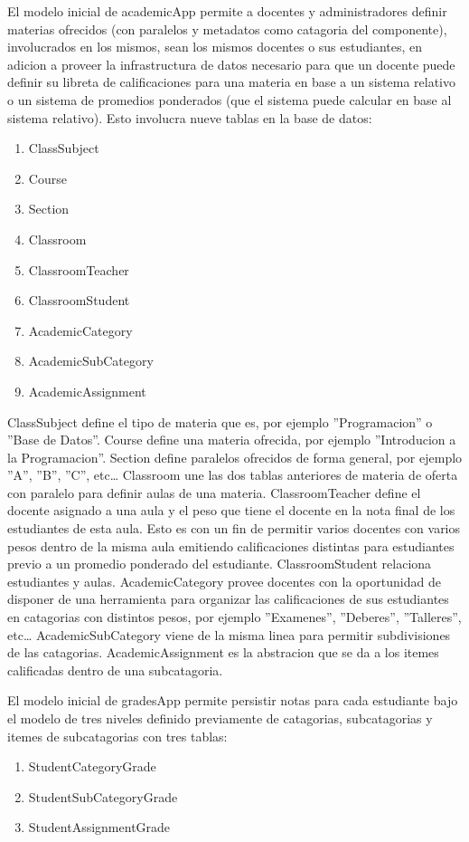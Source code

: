 El modelo inicial de academicApp permite a docentes y administradores definir materias ofrecidos (con paralelos y metadatos como catagoria del componente), involucrados en los mismos, sean los mismos docentes o sus estudiantes, en adicion a proveer la infrastructura de datos necesario para que un docente puede definir su libreta de calificaciones para una materia en base a un sistema relativo o un sistema de promedios ponderados (que el sistema puede calcular en base al sistema relativo). Esto involucra nueve tablas en la base de datos:
\begin{enumerate}
  \item ClassSubject
  \item Course
  \item Section
  \item Classroom
  \item ClassroomTeacher
  \item ClassroomStudent
  \item AcademicCategory
  \item AcademicSubCategory
  \item AcademicAssignment
\end{enumerate}
ClassSubject define el tipo de materia que es, por ejemplo ''Programacion'' o ''Base de Datos''. Course define una materia ofrecida, por ejemplo ''Introducion a la Programacion''. Section define paralelos ofrecidos de forma general, por ejemplo ''A'', ''B'', ''C'', etc\ldots{} Classroom une las dos tablas anteriores de materia de oferta con paralelo para definir aulas de una materia. ClassroomTeacher define el docente asignado a una aula y el peso que tiene el docente en la nota final de los estudiantes de esta aula. Esto es con un fin de permitir varios docentes con varios pesos dentro de la misma aula emitiendo calificaciones distintas para estudiantes previo a un promedio ponderado del estudiante. ClassroomStudent relaciona estudiantes y aulas. AcademicCategory provee docentes con la oportunidad de disponer de una herramienta para organizar las calificaciones de sus estudiantes en catagorias con distintos pesos, por ejemplo ''Examenes'', ''Deberes'', ''Talleres'', etc\ldots{} AcademicSubCategory viene de la misma linea para permitir subdivisiones de las catagorias. AcademicAssignment es la abstracion que se da a los itemes calificadas dentro de una subcatagoria.

El modelo inicial de gradesApp permite persistir notas para cada estudiante bajo el modelo de tres niveles definido previamente de catagorias, subcatagorias y itemes de subcatagorias con tres tablas:
\begin{enumerate}
  \item StudentCategoryGrade
  \item StudentSubCategoryGrade
  \item StudentAssignmentGrade
\end{enumerate}


